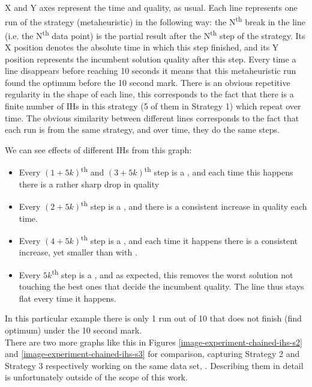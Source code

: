 X and Y axes represent the time and quality, as usual. Each line represents one run of the strategy (metaheuristic) in the following way: the N\textsuperscript{th} break in the line (i.e. the N\textsuperscript{th} data point) is the partial result after the N\textsuperscript{th} step of the strategy. Its X position denotes the absolute time in which this step finished, and its Y position represents the incumbent solution quality after this step. Every time a line disappears before reaching 10 seconds it means that this metaheuristic run found the optimum before the 10 second mark. There is an obvious repetitive regularity in the shape of each line, this corresponds to the fact that there is a finite number of IHs in this strategy (5 of them in Strategy 1) which repeat over time. The obvious similarity between different lines corresponds to the fact that each run is from the same strategy, and over time, they do the same steps.

We can see effects of different IHs from this graph:
\begin{itemize}
	\item Every $(1 + 5k)$\textsuperscript{th} and $(3 + 5k)$\textsuperscript{th} step is a , and each time this happens there is a rather sharp drop in quality
	\item Every $(2 + 5k)$\textsuperscript{th} step is a , and there is a consistent increase in quality each time.
	\item Every $(4 + 5k)$\textsuperscript{th} step is a , and each time it happens there is a consistent increase, yet smaller than with .
	\item Every $5k$\textsuperscript{th} step is a , and as expected, this removes the worst solution not touching the best ones that decide the incumbent quality. The line thus stays flat every time it happens.
\end{itemize}

In this particular example there is only 1 run out of 10 that does not finish (find optimum) under the 10 second mark.\\

There are two more graphs like this in Figures \ref{image-experiment-chained-ihs-s2} and \ref{image-experiment-chained-ihs-s3} for comparison, capturing Strategy 2 and Strategy 3 respectively working on the same data set, . Describing them in detail is unfortunately outside of the scope of this work.\\

